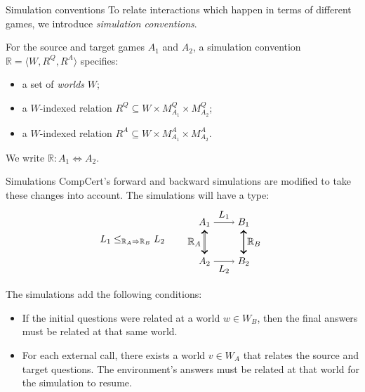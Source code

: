 \documentclass{beamer}
\begin{document}
\begin{frame}{Simulation conventions} %
To relate interactions which happen in terms of different games,
we introduce \emph{simulation conventions}.

\vspace{1em}
For the source and target games $A_1$ and $A_2$,
a simulation convention
$\mathbb{R} = \langle W, R^Q, R^A \rangle$
specifies:
\begin{itemize}
\item a set of \emph{worlds} $W$;
\item a $W$-indexed relation
$R^Q \subseteq W \times M_{A_1}^Q \times M_{A_2}^Q$;
\item a $W$-indexed relation
$R^A \subseteq W \times M_{A_1}^A \times M_{A_2}^A$.
\end{itemize}

\vspace{1em}
We write $\mathbb{R} : A_1 \Leftrightarrow A_2$.
\end{frame}

\begin{frame}{Simulations} %
CompCert's forward and backward simulations are modified to
take these changes into account.
The simulations will have a type:
\[
  L_1 \le_{\mathbb{R}_A \Rightarrow \mathbb{R}_B} L_2 \qquad
  \begin{tikzpicture}[baseline,scale=0.7]
    \node (A1) at (-1,  1) {$A_1$};
    \node (A2) at (-1, -1) {$A_2$};
    \node (B1) at ( 1,  1) {$B_1$};
    \node (B2) at ( 1, -1) {$B_2$};
    \draw (A1) edge[->] node[auto] {$L_1$} (B1);
    \draw (A2) edge[->] node[auto,swap] {$L_2$} (B2);
    \draw (A1) edge[<->, double] node[auto,swap] {$\mathbb{R}_A$} (A2);
    \draw (B1) edge[<->, double] node[auto] {$\mathbb{R}_B$} (B2);
  \end{tikzpicture}
\]

The simulations add the following conditions:
\begin{itemize}
\item If the initial questions were related at a world $w \in W_B$,
  then the final answers must be related at that same world.
\item For each external call,
  there exists a world $v \in W_A$ that relates
  the source and target questions.
  The environment's answers must be related at that world
  for the simulation to resume.
\end{itemize}
\end{frame}
\end{document}
